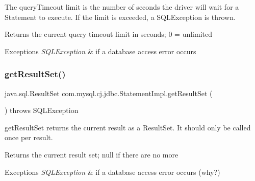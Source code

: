 The query\+Timeout limit is the number of seconds the driver will wait for a Statement to execute. If the limit is exceeded, a S\+Q\+L\+Exception is thrown.

\begin{DoxyReturn}{Returns}
the current query timeout limit in seconds; 0 = unlimited
\end{DoxyReturn}

\begin{DoxyExceptions}{Exceptions}
{\em S\+Q\+L\+Exception} & if a database access error occurs \\
\hline
\end{DoxyExceptions}
\mbox{\label{classcom_1_1mysql_1_1cj_1_1jdbc_1_1_statement_impl_a8bf30f2ecfd13ebcfbde03b082172bb1}} 
\subsubsection{\texorpdfstring{get\+Result\+Set()}{getResultSet()}}
{\footnotesize\ttfamily java.\+sql.\+Result\+Set com.\+mysql.\+cj.\+jdbc.\+Statement\+Impl.\+get\+Result\+Set (\begin{DoxyParamCaption}{ }\end{DoxyParamCaption}) throws S\+Q\+L\+Exception}

get\+Result\+Set returns the current result as a Result\+Set. It should only be called once per result.

\begin{DoxyReturn}{Returns}
the current result set; null if there are no more
\end{DoxyReturn}

\begin{DoxyExceptions}{Exceptions}
{\em S\+Q\+L\+Exception} & if a database access error occurs (why?) \\
\hline
\end{DoxyExceptions}
\mbox{\label{classcom_1_1mysql_1_1cj_1_1jdbc_1_1_statement_impl_a4a5fa990b06601f984e4393d6cb02b26}} 
